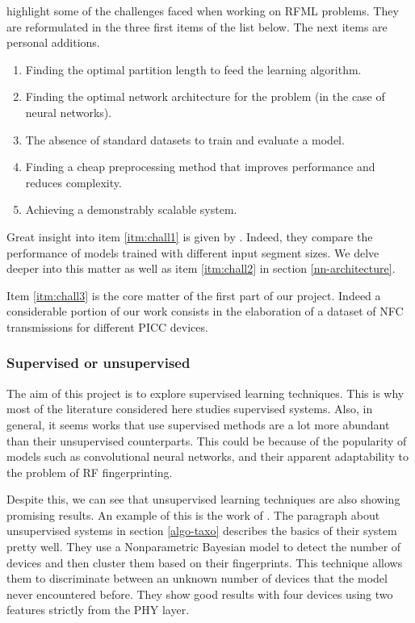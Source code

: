 \textcite{riyaz_deep_2018} highlight some of the challenges faced when working on RFML problems. They are reformulated in the three first items of the list below. The next items are personal additions.

\begin{enumerate}
  \item \label{itm:chall1} Finding the optimal partition length to feed the learning algorithm.
  \item \label{itm:chall2} Finding the optimal network architecture for the problem (in the case of neural networks).
  \item \label{itm:chall3} The absence of standard datasets to train and evaluate a model.
  \item Finding a cheap preprocessing method that improves performance and reduces complexity.
  \item Achieving a demonstrably scalable system.
\end{enumerate}

Great insight into item \ref{itm:chall1} is given by \textcite{youssef_machine_2017}. Indeed, they compare the performance of models trained with different input segment sizes. We delve deeper into this matter as well as item \ref{itm:chall2} in section \ref{nn-architecture}.

Item \ref{itm:chall3} is the core matter of the first part of our project. Indeed a considerable portion of our work consists in the elaboration of a dataset of NFC transmissions for different PICC devices.

\subsubsection{Supervised or unsupervised}

The aim of this project is to explore supervised learning techniques. This is why most of the literature considered here studies supervised systems. Also, in general, it seems works that use supervised methods are a lot more abundant than their unsupervised counterparts. This could be because of the popularity of models such as convolutional neural networks, and their apparent adaptability to the problem of RF fingerprinting.

Despite this, we can see that unsupervised learning techniques are also showing promising results. An example of this is the work of \textcite{nguyen_device_2011}. The paragraph about unsupervised systems in section \ref{algo-taxo} describes the basics of their system pretty well. They use a Nonparametric Bayesian model to detect the number of devices and then cluster them based on their fingerprints. This technique allows them to discriminate between an unknown number of devices that the model never encountered before. They show good results with four devices using two features strictly from the PHY layer.

